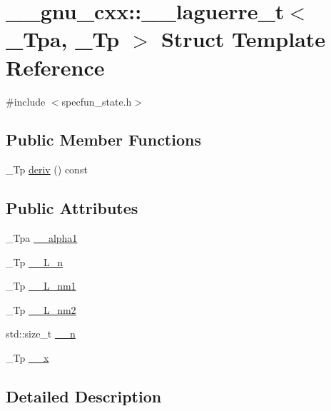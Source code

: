 \hypertarget{struct____gnu__cxx_1_1____laguerre__t}{}\section{\+\_\+\+\_\+gnu\+\_\+cxx\+:\+:\+\_\+\+\_\+laguerre\+\_\+t$<$ \+\_\+\+Tpa, \+\_\+\+Tp $>$ Struct Template Reference}
\label{struct____gnu__cxx_1_1____laguerre__t}


{\ttfamily \#include $<$specfun\+\_\+state.\+h$>$}

\subsection*{Public Member Functions}
\begin{DoxyCompactItemize}
\item 
\+\_\+\+Tp \hyperlink{struct____gnu__cxx_1_1____laguerre__t_aed1a4e46a049188de5ca6c2cc9bc5cdf}{deriv} () const
\end{DoxyCompactItemize}
\subsection*{Public Attributes}
\begin{DoxyCompactItemize}
\item 
\+\_\+\+Tpa \hyperlink{struct____gnu__cxx_1_1____laguerre__t_a8aa1b08deed3b739c3de21953f2c5494}{\+\_\+\+\_\+alpha1}
\item 
\+\_\+\+Tp \hyperlink{struct____gnu__cxx_1_1____laguerre__t_a788683f1d238f34930550685f47d51de}{\+\_\+\+\_\+\+L\+\_\+n}
\item 
\+\_\+\+Tp \hyperlink{struct____gnu__cxx_1_1____laguerre__t_a29f45a9e9d5c11d38edbdae5fc58f23b}{\+\_\+\+\_\+\+L\+\_\+nm1}
\item 
\+\_\+\+Tp \hyperlink{struct____gnu__cxx_1_1____laguerre__t_a30eafa5b438d9561576bf73d1d4fa66d}{\+\_\+\+\_\+\+L\+\_\+nm2}
\item 
std\+::size\+\_\+t \hyperlink{struct____gnu__cxx_1_1____laguerre__t_a15ac2355cafa2897c42b72963f63cc64}{\+\_\+\+\_\+n}
\item 
\+\_\+\+Tp \hyperlink{struct____gnu__cxx_1_1____laguerre__t_a20e54c0367109c5d25218938bca406ee}{\+\_\+\+\_\+x}
\end{DoxyCompactItemize}


\subsection{Detailed Description}
